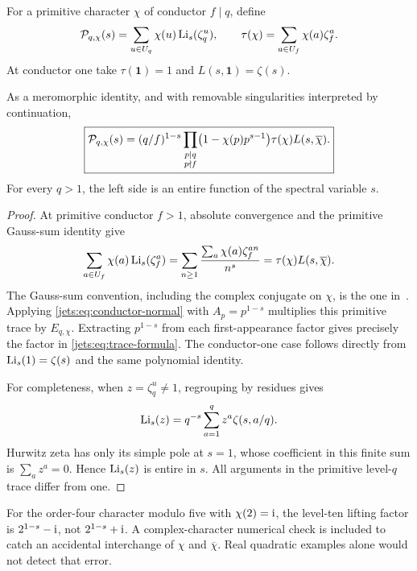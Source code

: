 For a primitive character $\chi$ of conductor $f\mid q$, define
\begin{equation}\label{jets:eq:trace-definition}
 \mathcal P_{q,\chi}(s)=
 \sum_{u\in U_q}\chi(u)\operatorname{Li}_s(\zeta_q^u),\qquad
 \tau(\chi)=\sum_{a\in U_f}\chi(a)\zeta_f^a.
\end{equation}
At conductor one take $\tau(\mathbf1)=1$ and $L(s,\mathbf1)=\zeta(s)$.

\begin{theorem}\label{jets:thm:trace}
As a meromorphic identity, and with removable singularities interpreted
by continuation,
\begin{equation}\label{jets:eq:trace-formula}
 \boxed{\displaystyle
 \mathcal P_{q,\chi}(s)=
 (q/f)^{1-s}
 \prod_{\substack{p\mid q\\p\nmid f}}
 \bigl(1-\chi(p)p^{s-1}\bigr)
 \tau(\chi)L(s,\overline\chi).}
\end{equation}
For every $q>1$, the left side is an entire function of the spectral
variable $s$.
\end{theorem}
\begin{proof}
At primitive conductor $f>1$, absolute convergence and the primitive
Gauss-sum identity give
\[
 \sum_{a\in U_f}\chi(a)\operatorname{Li}_s(\zeta_f^a)
 =\sum_{n\ge1}\frac{\sum_a\chi(a)\zeta_f^{an}}{n^s}
 =\tau(\chi)L(s,\overline\chi).
\]
The Gauss-sum convention, including the complex conjugate on $\chi$,
is the one in~\cite{jets:dlmf-dirichlet}. Applying
\eqref{jets:eq:conductor-normal} with $A_p=p^{1-s}$ multiplies this
primitive trace by $E_{q,\chi}$. Extracting $p^{1-s}$ from each
first-appearance factor gives precisely the factor in
\eqref{jets:eq:trace-formula}. The conductor-one case follows directly
from $\operatorname{Li}_s(1)=\zeta(s)$ and the same polynomial identity.

For completeness, when $z=\zeta_q^u\ne1$, regrouping by residues gives
\begin{equation}\label{jets:eq:polylog-Hurwitz-DFT}
 \operatorname{Li}_s(z)=q^{-s}\sum_{a=1}^q z^a\zeta(s,a/q).
\end{equation}
Hurwitz zeta has only its simple pole at $s=1$, whose coefficient in
this finite sum is $\sum_a z^a=0$. Hence $\operatorname{Li}_s(z)$ is entire in $s$.
All arguments in the primitive level-$q$ trace differ from one.
\end{proof}

\begin{remark}
For the order-four character modulo five with $\chi(2)=\mathrm{i}$, the
level-ten lifting factor is $2^{1-s}-\mathrm{i}$, not
$2^{1-s}+\mathrm{i}$. A complex-character numerical check is included to
catch an accidental interchange of $\chi$ and $\overline\chi$.
Real quadratic examples alone would not detect that error.
\end{remark}

